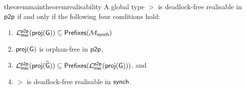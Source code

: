 \begin{restatable}{theorem}{maintheoremrealisability}
    \label{thm:main-theorem-realisability}
        A global type $\gt$ is  deadlock-free realisable in $\mathsf{p2p}$
        if and only if the following four conditions hold:
        \begin{enumerate}
            \item $\mathcal{L}_{\mathsf{msc}}^{\mathsf{p2p}}(\mathsf{proj}(\mathsf{G}))\subseteq\mathsf{Prefixes}(\mathcal{M}_{\mathsf{synch}})$
            \item $\mathsf{proj}(\mathsf{G})$ is orphan-free in $\mathsf{p2p}$, 
            \item $\mathcal{L}_{\mathsf{msc}}^{\mathsf{p2p}}(\mathsf{proj}(\widehat{\mathsf{G}}))\subseteq\mathsf{Prefixes}(\mathcal{L}_{\mathsf{msc}}^{\mathsf{p2p}}(\mathsf{proj}(\mathsf{G})))$, and 
            \item $\gt$ is deadlock-free realisable in $\mathsf{synch}$.
        \end{enumerate}  
\end{restatable}
